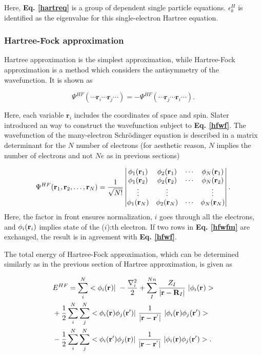 \documentclass[a4paper, 12pt, titlepage,oneside,drop]{kthesis}
\begin{document}
Here, \textbf{Eq. \ref{hartreq}} is a group of dependent single particle equations. $\epsilon_k^{{H}}$ is identified as the eigenvalue for this single-electron Hartree equation.

\subsubsection{Hartree-Fock approximation}
Hartree approximation is the simplest approximation, while Hartree-Fock approximation is a method which considers the antisymmetry of the wavefunction. It is shown as

\begin{equation}\label{hfwf}
\Psi^{HF} ( \cdots \textbf{r}_{i} \cdots  \textbf{r}_{j} \cdots ) = - \Psi^{HF} ( \cdots \textbf{r}_{j} \cdots  \textbf{r}_{i} \cdots).
\end{equation}

Here, each variable ${\textbf{r}_{{i}}}$ includes the coordinates of space and spin. Slater introduced an way to construct the wavefunction subject to \textbf{Eq. \ref{hfwf}}. The wavefunction of the many-electron 
Schrödinger equation is described in a matrix determinant for the $N$ number of electrons (for aesthetic reason, $N$ implies the number of electrons and not $Ne$ as in previous sections)

\begin{equation}\label{hfwfm}
\Psi^{HF}(\textbf{r}_1, \textbf{r}_2, \ldots, \textbf{r}_N) =
\frac{1}{\sqrt{N!}} \left|
\begin{matrix}
    \bwff<1><1> & \bwff<2><1> & \cdots & \bwff<N><1> \\
    \bwff<1><2> & \bwff<2><2> & \cdots & \bwff<N><2> \\
    \vdots               & \vdots               &        & \vdots               \\
    \bwff<1><N> & \bwff<2><N> & \cdots & \bwff<N><N>
\end{matrix} \right|.
\end{equation}
\noindent Here, the factor in front ensures normalization, $i$ goes through all the electrons, and $\bwff<i><i>$ implies state of the ($i$):th electron. If two rows in \textbf{Eq. \ref{hfwfm}} are exchanged, the result is 
in agreement with \textbf{Eq. \ref{hfwf}}.

The total energy of Hartree-Fock approximation, which can be determined similarly as in the previous section of Hartree approximation, is given as

\begin{equation}\begin{split}
&E^{HF} = \sum\limits_i^{{N}} <\bwff<i><> |\ -\frac{\nabla^{2}_{i}}{2} + \sum\limits_I^{{Nn}} \frac{Z_{I}}{|\textbf{r}-\textbf{R}_{I}|}  \ | \bwff<i><> > \\
& + \frac{1}{2} \sum\limits_i^{{N}} \sum\limits_j^{{N}} <\bwff<i><> \bwfn<j><'>|\ \frac{1}{|\textbf{r} - \textbf{r}^{'} |} \ | \bwff<i><> \bwfn<j><'>> \\
& - \frac{1}{2} \sum\limits_i^{{N}} \sum\limits_j^{{N}} <\bwfn<i><'> \bwfn<j><>|\ \frac{1}{|\textbf{r} - \textbf{r}^{'} |} \ | \bwfn<i><> \bwfn<j><'>>.
\end{split}\end{equation}
\end{document}
